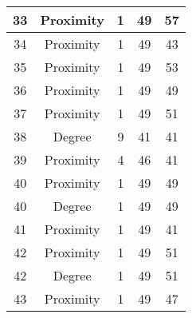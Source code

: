 \documentclass[results.tex]{subfiles}
\begin{document}
\begin{center}
\begin{tabular}{| c || c | c | c | c |}
            \hline
            33                      & Proximity                    & 1                      & 49                      & 57                   \\
            \hline
            34                      & Proximity                    & 1                      & 49                      & 43                   \\
            \hline
            35                      & Proximity                    & 1                      & 49                      & 53                   \\
            \hline
            36                      & Proximity                    & 1                      & 49                      & 49                   \\
            \hline
            37                      & Proximity                    & 1                      & 49                      & 51                   \\
            \hline
            38                      & Degree                       & 9                      & 41                      & 41                   \\
            \hline
            39                      & Proximity                    & 4                      & 46                      & 41                   \\
            \hline
            40                      & Proximity                    & 1                      & 49                      & 49                   \\
            \hline
            40                      & Degree                       & 1                      & 49                      & 49                   \\
            \hline
            41                      & Proximity                    & 1                      & 49                      & 41                   \\
            \hline
            42                      & Proximity                    & 1                      & 49                      & 51                   \\
            \hline
            42                      & Degree                       & 1                      & 49                      & 51                   \\
            \hline
            43                      & Proximity                    & 1                      & 49                      & 47                   \\

\end{tabular}
\end{center}
\end{document}
